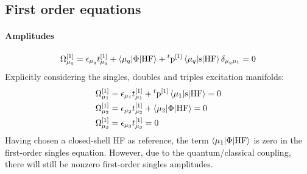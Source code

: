 \subsection{First order equations}\label{sec:first-order-pt}

\paragraph*{Amplitudes}
\begin{equation}\label{eq:1st-order-amp}
  \Omega_{\mu_q}^{[1]} = \epsilon_{\mu_q}t_{\mu_q}^{[1]}
  + \braket{\mu_q | \Phi | \mathrm{HF}}
  + {}^t\mathrm{p}^{[1]}\braket{\mu_q | \mathrm{s} | \mathrm{HF}}\delta_{\mu_q\mu_1}
  = 0
\end{equation}
Explicitly considering the singles, doubles and triples excitation manifolds:
\begin{subequations}
  \begin{align}
  \Omega_{\mu_1}^{[1]} &= \epsilon_{\mu_1}t_{\mu_1}^{[1]}
  + {}^t\mathrm{p}^{[1]}\braket{\mu_1 | \mathrm{s} | \mathrm{HF}}
  = 0 \label{eq:1st-order-amp-singles} \\
  \Omega_{\mu_2}^{[1]} &= \epsilon_{\mu_2}t_{\mu_2}^{[1]}
  + \braket{\mu_2 | \Phi | \mathrm{HF}}
  = 0 \\
  \Omega_{\mu_3}^{[1]} &= \epsilon_{\mu_3}t_{\mu_3}^{[1]} = 0
  \end{align}
\end{subequations}
Having chosen a closed-shell \acrshort{HF} as reference,
the term $\braket{\mu_1 | \Phi | \mathrm{HF}}$ is zero in the
first-order singles equation. However, due to the quantum/classical
coupling, there will still be nonzero first-order singles amplitudes.

